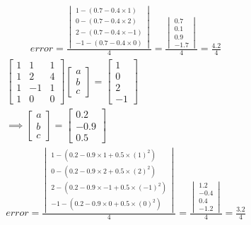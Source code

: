 \begin{gather*}
    \\
    error = \frac{\begin{vmatrix}
        1 - (0.7 - 0.4 \times 1)\\
        0 - (0.7 - 0.4 \times 2)\\
        2 - (0.7 - 0.4 \times -1)\\
        -1 - (0.7 - 0.4 \times 0)
    \end{vmatrix}}{4}
    = 
    \frac{\begin{vmatrix}
        0.7\\
        0.1\\
        0.9\\
        -1.7
    \end{vmatrix}}{4}
    = \frac{4.2}{4}
\end{gather*}
\begin{gather*}
    \begin{bmatrix}
        1 & 1 & 1\\
        1 & 2 & 4\\
        1 & -1 & 1\\
        1 & 0 & 0
    \end{bmatrix}
    \begin{bmatrix}
        a\\b\\c
    \end{bmatrix}
    =
    \begin{bmatrix}
        1\\0\\2\\-1
    \end{bmatrix}
    \\\implies
    \begin{bmatrix}
        a\\b\\c
    \end{bmatrix}
    =
    \begin{bmatrix}
        0.2\\-0.9\\0.5
    \end{bmatrix}\\
    error = \frac{\begin{vmatrix}
        1 - (0.2 - 0.9 \times 1 +  0.5 \times (1 )^2)\\
        0 - (0.2 - 0.9 \times 2 +  0.5 \times (2 )^2)\\
        2 - (0.2 - 0.9 \times -1 + 0.5 \times (-1)^2)\\
        -1 - (0.2 - 0.9 \times 0 + 0.5 \times ( 0)^2)
    \end{vmatrix}}{4}
    = 
    \frac{\begin{vmatrix}
        1.2\\
        -0.4\\
        0.4\\
        -1.2
    \end{vmatrix}}{4}
    = \frac{3.2}{4}
\end{gather*}

